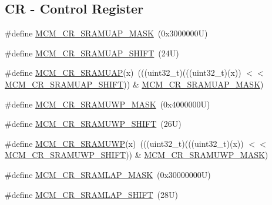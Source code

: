 \subsection*{CR -\/ Control Register}
\begin{DoxyCompactItemize}
\item 
\#define \mbox{\hyperlink{group___d_m_a___register___masks_ga39213f9a00cf1862ab3e77c839e71c78}{M\+C\+M\+\_\+\+C\+R\+\_\+\+S\+R\+A\+M\+U\+A\+P\+\_\+\+M\+A\+SK}}~(0x3000000\+U)
\item 
\#define \mbox{\hyperlink{group___d_m_a___register___masks_ga4608d3fb1b05eb0d37515c4686f6190c}{M\+C\+M\+\_\+\+C\+R\+\_\+\+S\+R\+A\+M\+U\+A\+P\+\_\+\+S\+H\+I\+FT}}~(24\+U)
\item 
\#define \mbox{\hyperlink{group___d_m_a___register___masks_gab9b0e14b6d8b8eb48c993e37da8fd709}{M\+C\+M\+\_\+\+C\+R\+\_\+\+S\+R\+A\+M\+U\+AP}}(x)~(((uint32\+\_\+t)(((uint32\+\_\+t)(x)) $<$$<$ \mbox{\hyperlink{group___d_m_a___register___masks_ga4608d3fb1b05eb0d37515c4686f6190c}{M\+C\+M\+\_\+\+C\+R\+\_\+\+S\+R\+A\+M\+U\+A\+P\+\_\+\+S\+H\+I\+FT}})) \& \mbox{\hyperlink{group___d_m_a___register___masks_ga39213f9a00cf1862ab3e77c839e71c78}{M\+C\+M\+\_\+\+C\+R\+\_\+\+S\+R\+A\+M\+U\+A\+P\+\_\+\+M\+A\+SK}})
\item 
\#define \mbox{\hyperlink{group___d_m_a___register___masks_ga80116d649929d7c9ad773cebd4e4c3bb}{M\+C\+M\+\_\+\+C\+R\+\_\+\+S\+R\+A\+M\+U\+W\+P\+\_\+\+M\+A\+SK}}~(0x4000000\+U)
\item 
\#define \mbox{\hyperlink{group___d_m_a___register___masks_ga73c2b0e8ecdcd2a07070c863db3e9fcd}{M\+C\+M\+\_\+\+C\+R\+\_\+\+S\+R\+A\+M\+U\+W\+P\+\_\+\+S\+H\+I\+FT}}~(26\+U)
\item 
\#define \mbox{\hyperlink{group___d_m_a___register___masks_ga35fb5ca42636f6aa9e91f8c16384787f}{M\+C\+M\+\_\+\+C\+R\+\_\+\+S\+R\+A\+M\+U\+WP}}(x)~(((uint32\+\_\+t)(((uint32\+\_\+t)(x)) $<$$<$ \mbox{\hyperlink{group___d_m_a___register___masks_ga73c2b0e8ecdcd2a07070c863db3e9fcd}{M\+C\+M\+\_\+\+C\+R\+\_\+\+S\+R\+A\+M\+U\+W\+P\+\_\+\+S\+H\+I\+FT}})) \& \mbox{\hyperlink{group___d_m_a___register___masks_ga80116d649929d7c9ad773cebd4e4c3bb}{M\+C\+M\+\_\+\+C\+R\+\_\+\+S\+R\+A\+M\+U\+W\+P\+\_\+\+M\+A\+SK}})
\item 
\#define \mbox{\hyperlink{group___d_m_a___register___masks_gad9a5f5487e03cefac1a4798ccce630bc}{M\+C\+M\+\_\+\+C\+R\+\_\+\+S\+R\+A\+M\+L\+A\+P\+\_\+\+M\+A\+SK}}~(0x30000000\+U)
\item 
\#define \mbox{\hyperlink{group___d_m_a___register___masks_ga083d0b4e4188e656d92bfa8fb9b4eca9}{M\+C\+M\+\_\+\+C\+R\+\_\+\+S\+R\+A\+M\+L\+A\+P\+\_\+\+S\+H\+I\+FT}}~(28\+U)

\end{DoxyCompactItemize}
